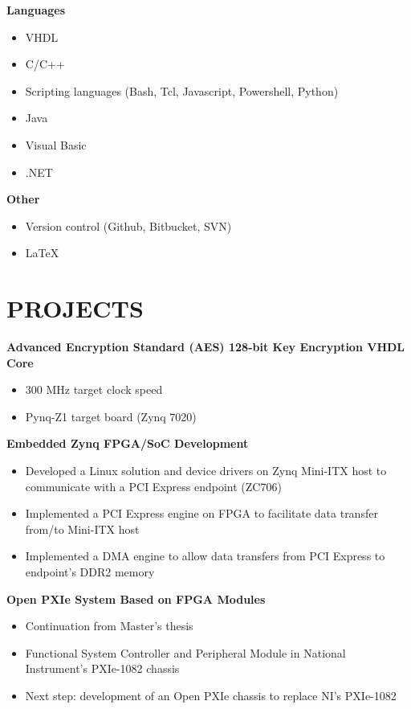 \documentclass[3pt]{res}
\begin{document}
\begin{resume}
\begin{itemize}[noitemsep]
    \end{itemize}

{\bf Languages}
    \begin{itemize}[noitemsep]
      \item VHDL
      \item C/C++
      \item Scripting languages (Bash, Tcl, Javascript, Powershell, Python)
      \item Java
      \item Visual Basic
      \item .NET
    \end{itemize}

{\bf Other}
    \begin{itemize}[noitemsep]
      \item Version control (Github, Bitbucket, SVN)
      \item \LaTeX
    \end{itemize}

\section{PROJECTS}
\vspace{0.1in}


     {\bf Advanced Encryption Standard (AES) 128-bit Key Encryption VHDL Core}
  \begin{itemize}
    \item 300 MHz target clock speed
    \item Pynq-Z1 target board (Zynq 7020)
  \end{itemize}


   {\bf Embedded Zynq FPGA/SoC Development}
    \begin{itemize}[noitemsep] %
      \item Developed a Linux solution and device drivers on Zynq Mini-ITX host to communicate with a PCI Express endpoint (ZC706)
      \item Implemented a PCI Express engine on FPGA to facilitate data transfer from/to Mini-ITX host
      \item Implemented a DMA engine to allow data transfers from PCI Express to endpoint's DDR2 memory
      \end{itemize}



 {\bf Open PXIe System Based on FPGA Modules}
    \begin{itemize}[noitemsep] %
      \item Continuation from Master's thesis
      \item Functional System Controller and Peripheral Module in National Instrument's PXIe-1082 chassis
      \item Next step: development of an Open PXIe chassis to replace NI's PXIe-1082
      \end{itemize}


\end{resume}
\end{document}
